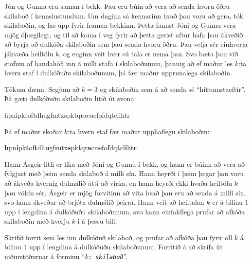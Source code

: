 

Jón og Gunna eru saman í bekk. Þau eru búin að vera að senda hvoru öðru
skilaboð í kennslustundum. Um daginn sá kennarinn hvað þau voru að gera, tók
skilaboðin, og las upp fyrir framan bekkinn. Þetta fannst Jóni og Gunnu vera
mjög óþægilegt, og til að koma í veg fyrir að þetta gerist aftur hafa þau
ákveðið að byrja að dulkóða skilaboðin sem þau senda hvoru öðru. Þau velja sér
einhverja jákvæða heiltölu $k$, og enginn veit hver sú tala er nema þau. Svo
bæta þau við stöfum af handahófi inn á milli stafa í skilaboðunum, þannig að ef
maður les $k$:ta hvern staf í dulkóðuðu skilaboðunum, þá fær maður upprunalega
skilaboðin.

Tökum dæmi. Segjum að $k=3$ og skilaboðin sem á að senda sé ``hittumstaeftir''. Þá gæti dulkóðuðu skilaboðin litið út svona:
\begin{center}
hpnipktoftdhugfmtxspktqracuefofdqtclihtr
\end{center}
Þá ef maður skoðar $k$:ta hvern staf fær maður upphaflegu skilaboðin:
\begin{center}
\textbf{h}pn\textbf{i}pk\textbf{t}of\textbf{t}dh\textbf{u}gf\textbf{m}tx\textbf{s}pk\textbf{t}qr\textbf{a}cu\textbf{e}fo\textbf{f}dq\textbf{t}cl\textbf{i}ht\textbf{r}
\end{center}

Hann Ásgeir litli er líka með Jóni og Gunnu í bekk, og hann er búinn að vera að
fylgjast með þeim senda skilaboð á milli sín. Hann heyrði í þeim þegar þau voru
að ákveða hvernig dulmálið átti að virka, en hann heyrði ekki hvaða heiltölu
$k$ þau völdu sér. Ásgeir er mjög forvitinn að vita hvað þau eru að senda á
milli sín, svo hann ákveður að brjóta dulmálið þeirra. Hann veit
að heiltalan $k$ er á bilinu $1$ upp í lengdina á dulkóðuðu skilaboðunum, svo hann
einfaldlega prufar að afkóða skilaboðin með hverju $k$-i á þessu bili.

Skrifið forrit sem les inn dulkóðuð skilaboð, og prufar að afkóða þau fyrir
öll $k$ á bilinu $1$ upp í lengdina á dulkóðuðu skilaboðunum. Forritið á að
skrifa út niðurstöðurnar á forminu ``\texttt{$k$: \textit{skilaboð}}''.

